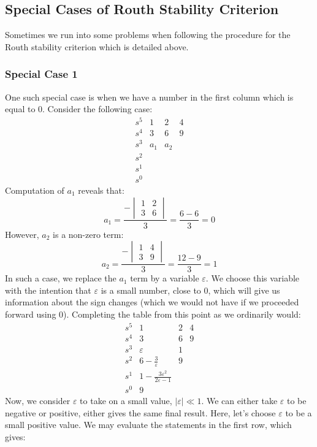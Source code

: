 \subsection{Special Cases of Routh Stability Criterion}
Sometimes we run into some problems when following the procedure for the Routh stability criterion which is detailed above.

\subsubsection{Special Case 1}
One such special case is when we have a number in the first column which is equal to $0$. Consider the following case:
    $$
    \begin{array}{lccc}
         s^5&1&2&4  \\
         s^4&3&6&9\\
         s^3&a_1&a_2\\
         s^2&&\\
         s^1&\\
         s^0&
    \end{array}
    $$
    Computation of $a_1$ reveals that:
        $$a_1=\frac{-\begin{vmatrix}
        1&2\\3&6
    \end{vmatrix}}{3}=\frac{6-6}{3}=0$$
    However, $a_2$ is a non-zero term:
            $$a_2=\frac{-\begin{vmatrix}
        1&4\\3&9
    \end{vmatrix}}{3}=\frac{12-9}{3}=1$$
    In such a case, we replace the $a_1$ term by a variable $\varepsilon$. We choose this variable with the intention that $\varepsilon$ is a small number, close to 0, which will give us information about the sign changes (which we would not have if we proceeded forward using $0$). Completing the table from this point as we ordinarily would:
        $$
    \begin{array}{lccc}
         s^5&1&2&4  \\
         s^4&3&6&9\\
         s^3&\varepsilon&1\\
         s^2&6-\frac{3}{\varepsilon}&9\\
         s^1&1-\frac{3\varepsilon^2}{2\varepsilon-1}\\
         s^0&9
    \end{array}
    $$
    Now, we consider $\varepsilon$ to take on a small value, $|\varepsilon|\ll1$. We can either take $\varepsilon$ to be negative or positive, either gives the same final result. Here, let's choose $\varepsilon$ to be a small positive value. We may evaluate the statements in the first row, which gives:
